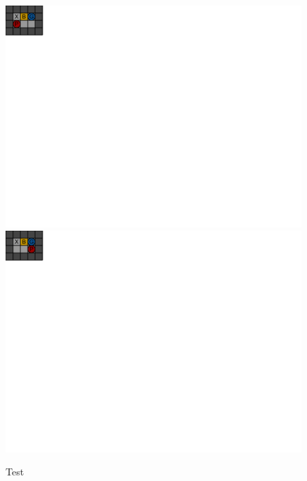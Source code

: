 \documentclass[a4paper,11pt]{article}
\renewcommand{\*}[0]{\cdot}
\begin{document}
\begin{figure}[h]
    \begin{center}
        \includegraphics{figures/equalState1}
        \includegraphics{figures/equalState2}
    \end{center}
    \caption{Test}
    \label{fig:test}
\end{figure}



 
\end{document}
